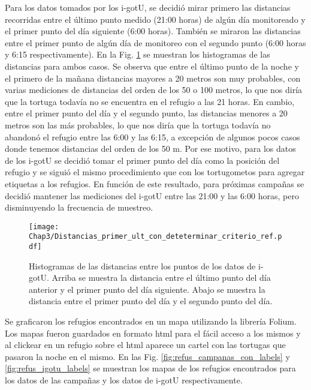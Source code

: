 Para los datos tomados por los i-gotU, se decidió mirar primero las distancias recorridas entre el último punto medido (21:00 horas) de algún día monitoreado y el primer punto del día siguiente (6:00 horas). También se miraron las distancias entre el primer punto de algún día de monitoreo con el segundo punto (6:00 horas y 6:15 respectivamente). En la Fig. \ref{fig:distancias} se muestran los histogramas de las distancias para ambos casos. Se observa que entre el último punto de la noche y el primero de la mañana distancias mayores a 20 metros son muy probables, con varias mediciones de distancias del orden de los 50 o 100 metros, lo que nos diría que la tortuga todavía no se encuentra en el refugio a las 21 horas. En cambio, entre el primer punto del día y el segundo punto, las distancias menores a 20 metros son las más probables, lo que nos diría que la tortuga todavía no abandonó el refugio entre las 6:00 y las 6:15, a excepción de algunos pocos casos donde tenemos distancias del orden de los 50 m. Por ese motivo, para los datos de los i-gotU se decidió tomar el primer punto del día como la posición del refugio y se siguió el mismo procedimiento que con los tortugometos para agregar etiquetas a los refugios. En función de este resultado, para próximas campañas se decidió mantener las mediciones del i-gotU entre las 21:00 y las 6:00 horas, pero disminuyendo la frecuencia de muestreo.
 
 
\begin{figure}[ht]
    \begin{center}
        \texttt{[image: Chap3/Distancias\_primer\_ult\_con\_deteterminar\_criterio\_ref.pdf]}
        \caption[Histogramas de las distancias entre los puntos de los datos de i-gotU.]{ Histogramas de las distancias entre los puntos de los datos de i-gotU. Arriba se muestra la distancia entre el último punto del día anterior y el primer punto del día siguiente. Abajo se muestra la distancia entre el primer punto del día y el segundo punto del día.}
        \label{fig:distancias}
        \end{center}
\end{figure}
 
Se graficaron los refugios encontrados en un mapa utilizando la librería Folium. Los mapas fueron guardados en formato html para el fácil acceso a los mismos y al clickear en un refugio sobre el html aparece un cartel con las tortugas que pasaron la noche en el mismo. En las Fig. \ref{fig:refus_campanas_con_labels} y \ref{fig:refus_igotu_labels} se muestran los mapas de los refugios encontrados para los datos de las campañas y los datos de i-gotU respectivamente.
 

